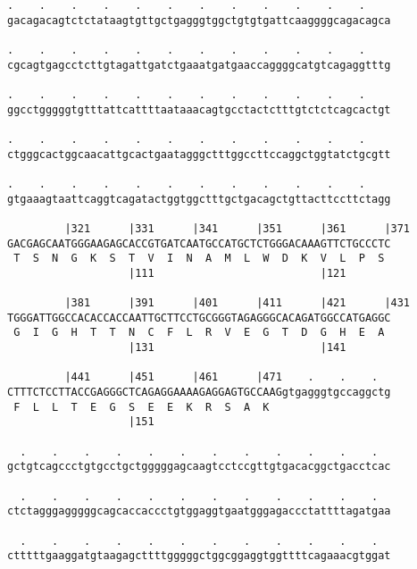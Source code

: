 \documentclass{article}
\begin{document}
\begin{Verbatim}
.    .    .    .    .    .    .    .    .    .    .    .    
gacagacagtctctataagtgttgctgagggtggctgtgtgattcaaggggcagacagca
                                                            
.    .    .    .    .    .    .    .    .    .    .    .    
cgcagtgagcctcttgtagattgatctgaaatgatgaaccaggggcatgtcagaggtttg
                                                            
.    .    .    .    .    .    .    .    .    .    .    .    
ggcctgggggtgtttattcattttaataaacagtgcctactctttgtctctcagcactgt
                                                            
.    .    .    .    .    .    .    .    .    .    .    .    
ctgggcactggcaacattgcactgaatagggctttggccttccaggctggtatctgcgtt
                                                            
.    .    .    .    .    .    .    .    .    .    .    .    
gtgaaagtaattcaggtcagatactggtggctttgctgacagctgttacttccttctagg
                                                            
         |321      |331      |341      |351      |361      |371
GACGAGCAATGGGAAGAGCACCGTGATCAATGCCATGCTCTGGGACAAAGTTCTGCCCTC
 T  S  N  G  K  S  T  V  I  N  A  M  L  W  D  K  V  L  P  S 
                   |111                          |121       
  
         |381      |391      |401      |411      |421      |431
TGGGATTGGCCACACCACCAATTGCTTCCTGCGGGTAGAGGGCACAGATGGCCATGAGGC
 G  I  G  H  T  T  N  C  F  L  R  V  E  G  T  D  G  H  E  A 
                   |131                          |141       
  
         |441      |451      |461      |471    .    .    .  
CTTTCTCCTTACCGAGGGCTCAGAGGAAAAGAGGAGTGCCAAGgtgagggtgccaggctg
 F  L  L  T  E  G  S  E  E  K  R  S  A  K                   
                   |151                                     
  
  .    .    .    .    .    .    .    .    .    .    .    .  
gctgtcagccctgtgcctgctgggggagcaagtcctccgttgtgacacggctgacctcac
                                                            
  .    .    .    .    .    .    .    .    .    .    .    .  
ctctagggagggggcagcaccaccctgtggaggtgaatgggagaccctattttagatgaa
                                                            
  .    .    .    .    .    .    .    .    .    .    .    .  
ctttttgaaggatgtaagagcttttgggggctggcggaggtggttttcagaaacgtggat
                                                            

\end{Verbatim}
\end{document}
